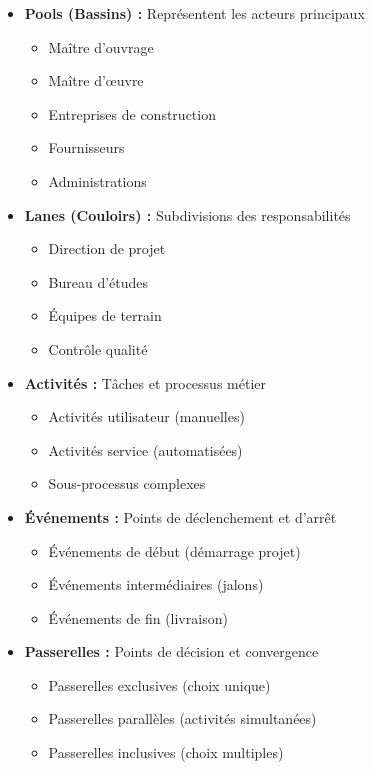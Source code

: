 \begin{itemize}
    \item \textbf{Pools (Bassins) :} Représentent les acteurs principaux
    \begin{itemize}
        \item Maître d'ouvrage
        \item Maître d'œuvre  
        \item Entreprises de construction
        \item Fournisseurs
        \item Administrations
    \end{itemize}
    
    \item \textbf{Lanes (Couloirs) :} Subdivisions des responsabilités
    \begin{itemize}
        \item Direction de projet
        \item Bureau d'études
        \item Équipes de terrain
        \item Contrôle qualité
    \end{itemize}
    
    \item \textbf{Activités :} Tâches et processus métier
    \begin{itemize}
        \item Activités utilisateur (manuelles)
        \item Activités service (automatisées)
        \item Sous-processus complexes
    \end{itemize}
    
    \item \textbf{Événements :} Points de déclenchement et d'arrêt
    \begin{itemize}
        \item Événements de début (démarrage projet)
        \item Événements intermédiaires (jalons)
        \item Événements de fin (livraison)
    \end{itemize}
    
    \item \textbf{Passerelles :} Points de décision et convergence
    \begin{itemize}
        \item Passerelles exclusives (choix unique)
        \item Passerelles parallèles (activités simultanées)
        \item Passerelles inclusives (choix multiples)
    \end{itemize}
\end{itemize}

